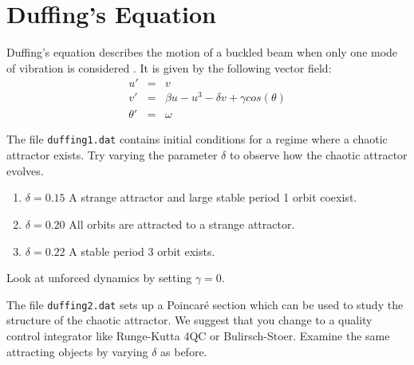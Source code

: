 \section{Duffing's Equation}

Duffing's equation describes the motion of a buckled beam when
only one mode of vibration is considered \cite{GH}.
It is given by the following  vector field:
\begin{eqnarray*}
	u' & = & v \\
	v' & = & \beta u - u^3 - \delta v + \gamma cos(\theta) \\
	\theta ' & = & \omega
\end{eqnarray*}

The file {\tt duffing1.dat} contains initial conditions 
for a regime where a chaotic attractor exists.  Try varying
the parameter $\delta$ to observe how the chaotic attractor evolves.
\begin{enumerate}
\item $\delta = 0.15$ A strange attractor and large stable period 1 orbit coexist.
\item $\delta = 0.20$ All orbits are attracted to a strange attractor.
\item $\delta = 0.22$ A stable period 3 orbit exists.
\end{enumerate}
Look at unforced dynamics by setting $\gamma = 0$.

The file {\tt duffing2.dat} sets up a Poincar\'{e} section which can be
used to study the structure of the chaotic attractor.
We suggest that you change to a quality control integrator like
Runge-Kutta 4QC or Bulirsch-Stoer.  Examine the same attracting
objects by varying $\delta$ as before.
